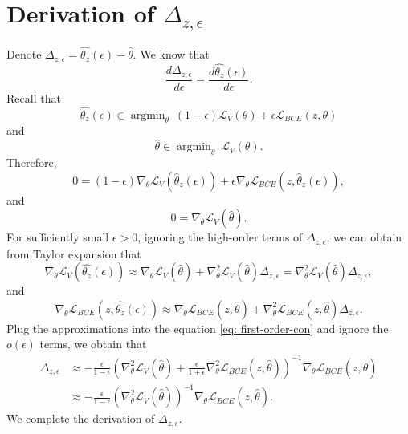 \appendix
\section{Derivation of $\Delta_{z, \epsilon}$}\label{appendix:derivation}
Denote $\Delta_{z, \epsilon} = \widehat{\theta_z}(\epsilon) - \hat{\theta}$. We know that 
\[
\frac{d\Delta_{z, \epsilon}}{d\epsilon} = \frac{d\widehat{\theta_z}(\epsilon)}{d\epsilon}.
\]
Recall that 
\[
\widehat{\theta_z}(\epsilon) \in \mathop{\arg\min}_{\theta} ~ (1 - \epsilon)\mathcal{L}_{{V}}(\theta)+\epsilon \mathcal{L}_{{BCE}}\left(z,\theta\right)
\]
and 
\[
\hat{\theta} \in \mathop{\arg\min}_{\theta} ~ \mathcal{L}_{{V}}(\theta).
\]
Therefore,
\begin{equation}
\label{eq: first-order-con}
0 = (1 - \epsilon)\nabla_{\theta}\mathcal{L}_V(\widehat{\theta}_z(\epsilon)) + \epsilon\nabla_{\theta}\mathcal{L}_{BCE}(z, \widehat{\theta}_z(\epsilon)),
\end{equation}
and
\[
0 = \nabla_{\theta}\mathcal{L}_V(\hat{\theta}).
\]
For sufficiently small $\epsilon > 0$, ignoring the high-order terms of $\Delta_{z,\epsilon}$, we can obtain from Taylor expansion that
\[
\nabla_{\theta}\mathcal{L}_V(\widehat{\theta_z}(\epsilon)) \approx \nabla_{\theta}\mathcal{L}_{V}(\hat{\theta}) + \nabla_{\theta}^2\mathcal{L}_V(\hat{\theta})\Delta_{z, \epsilon} = \nabla_{\theta}^2\mathcal{L}_V(\hat{\theta})\Delta_{z, \epsilon},
\]
and
\[
\nabla_{\theta}\mathcal{L}_{BCE}(z, \widehat{\theta_z}(\epsilon)) \approx \nabla_{\theta}\mathcal{L}_{BCE}(z, \hat{\theta}) + \nabla_{\theta}^2\mathcal{L}_{BCE}(z, \hat{\theta})\Delta_{z, \epsilon}.
\]
Plug the approximations into the equation \eqref{eq: first-order-con} and ignore the $o(\epsilon)$ terms, we obtain that
\begin{align*}
\Delta_{z, \epsilon} &\approx -\frac{\epsilon}{1 - \epsilon}\left(\nabla_{\theta}^2\mathcal{L}_V(\hat{\theta}) + \frac{\epsilon}{1 + \epsilon}\nabla_{\theta}^2\mathcal{L}_{BCE}(z, \hat{\theta})\right)^{-1}\nabla_{\theta}\mathcal{L}_{BCE}(z, \hat{\theta})\\
     & \approx -\frac{\epsilon}{1 - \epsilon}\left(\nabla_{\theta}^2\mathcal{L}_V(\hat{\theta})\right)^{-1}\nabla_{\theta}\mathcal{L}_{BCE}(z, \hat{\theta}).
\end{align*}
We complete the derivation of $\Delta_{z, \epsilon}$.

